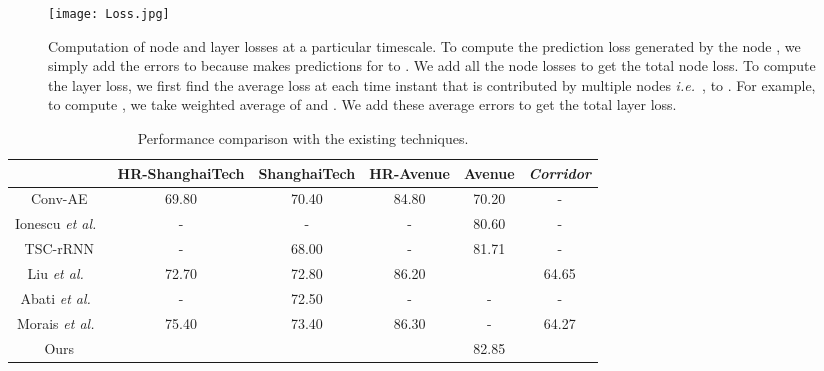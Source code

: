 \documentclass[conference]{IEEEtran}
\def\ie{\emph{i.e.~}}
\def\etal{\emph{et al.~}}
\begin{document}
\begin{figure*}
    \centering
    \texttt{[image: Loss.jpg]}
    \caption{Computation of node and layer losses at a particular timescale. To compute the prediction loss generated by the node , we simply add the errors  to  because  makes predictions for  to . We add all the node losses to get the total node loss. To compute the layer loss, we first find the average loss at each time instant that is contributed by multiple nodes \ie,  to . For example, to compute , we take weighted average of  and . We add these average errors to get the total layer loss.}
    \label{fig:loss}
\end{figure*}
\begin{table*}
\centering
\def\arraystretch{1.25}
\begin{tabular}{ |c | c c c c c| } 
 \hline
  & HR-ShanghaiTech & ShanghaiTech & HR-Avenue & Avenue & \textit{Corridor}\\ 
  \hline
 Conv-AE \cite{hasan2016} & 69.80 & 70.40 & 84.80 & 70.20 & -\\
 Ionescu \etal \cite{unmask} & - & - & - & 80.60 & - \\
TSC-rRNN \cite{TSC-RNN} & - & 68.00 & - & 81.71 & -\\ 
Liu \etal \cite{future} & 72.70 & 72.80 & 86.20 &  & 64.65\\ 
Abati \etal \cite{novelty} & - & 72.50 & - & - & -\\
 Morais \etal \cite{pose} & 75.40 & 73.40 & 86.30 & - & 64.27\\ 
 \hline
 Ours &  &  &  & 82.85 & \\
 \hline
\end{tabular}
\vspace{10pt}
\caption{Performance comparison with the existing techniques.}
\label{table:performance}
\end{table*}
\end{document}
